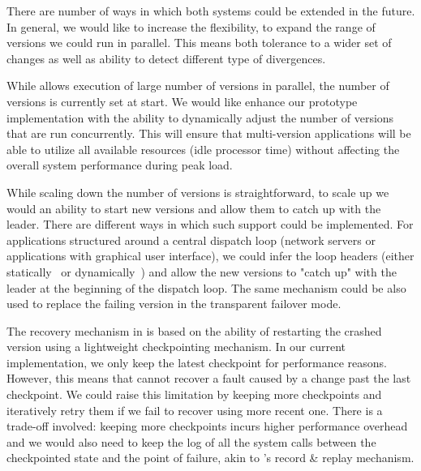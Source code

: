 There are number of ways in which both systems could be extended in the future.
In general, we would like to increase the flexibility, to expand the range of
versions we could run in parallel. This means both tolerance to a wider set of
changes as well as ability to detect different type of divergences.

While \varan allows execution of large number of versions in parallel, the
number of versions is currently set at start. We would like enhance our
prototype implementation with the ability to dynamically adjust the number of
versions that are run concurrently. This will ensure that multi-version
applications will be able to utilize all available resources (\ie idle
processor time) without affecting the overall system performance during peak
load.

While scaling down the number of versions is straightforward, to scale up we
would an ability to start new versions and allow them to catch up with the
leader. There are different ways in which such support could be implemented. For
applications structured around a central dispatch loop (\eg network servers or
applications with graphical user interface), we could infer the loop headers
(either statically~\cite{DJgraphs,havlak} or dynamically~\cite{sato11}) and
allow the new versions to "catch up" with the leader at the beginning of the
dispatch loop. The same mechanism could be also used to replace the failing
version in the transparent failover mode.

The recovery mechanism in \mx is based on the ability of restarting the crashed
version using a lightweight checkpointing mechanism. In our current
implementation, we only keep the latest checkpoint for performance reasons.
However, this means that \mx cannot recover a fault caused by a change past the
last checkpoint. We could raise this limitation by keeping more checkpoints and
iteratively retry them if we fail to recover using more recent one. There is a
trade-off involved: keeping more checkpoints incurs higher performance overhead
and we would also need to keep the log of all the system calls between the
checkpointed state and the point of failure, akin to \varan's record \& replay
mechanism.


